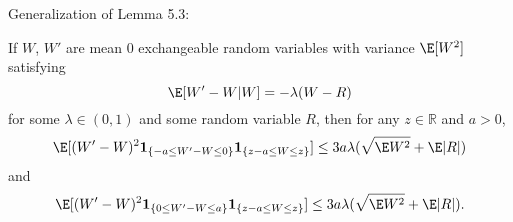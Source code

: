 Generalization of Lemma 5.3:
\begin{lemma}
  \label{L:stein-difference-second-moment-generalization-bound}
  If $W$, $W'$ are mean 0 exchangeable random variables with variance $\E[W^2]$
  satisfying
  \begin{equation*}
    \E[W'-W|W] = -\lambda(W-R)    
  \end{equation*}
  for some $\lambda \in (0,1)$ and some random variable $R$, then for any 
  $z \in \mathbb{R}$ and $a > 0$, 
  \begin{equation*}
    \E [(W'-W)^2 \mathbf{1}_{\{-a \leq W' - W \leq 0\}} \mathbf{1}_{\{z-a \leq W \leq z\}}] \leq 
    3a \lambda (\sqrt{\E W^2} + \E |R|)
  \end{equation*}
  and
  \begin{equation*}
    \E [(W'-W)^2 \mathbf{1}_{\{0 \leq W' - W \leq a\}} \mathbf{1}_{\{z-a \leq W \leq z\}}] \leq 
        3a \lambda (\sqrt{\E W^2} + \E |R|).
  \end{equation*}
\end{lemma}
